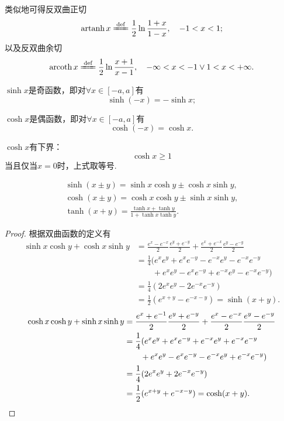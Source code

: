 类似地可得反双曲正切\[
	\artanh x
	\defeq
	\frac{1}{2} \ln\frac{1 + x}{1 - x},
	\quad -1<x<1;
\]
以及反双曲余切\[
	\arcoth x
	\defeq
	\frac{1}{2} \ln\frac{x + 1}{x - 1},
	\quad -\infty<x<-1\lor1<x<+\infty.
\]

\begin{property}
\(\sinh x\)是奇函数，即对\(\forall x \in [-a,a]\)有\[
	\sinh(-x) = -\sinh x;
\]

\(\cosh x\)是偶函数，即对\(\forall x \in [-a,a]\)有\[
	\cosh(-x) = \cosh x.
\]
\end{property}

\begin{property}
\(\cosh x\)有下界：\[
	\cosh x \geq 1
\]
当且仅当\(x=0\)时，上式取等号.
\end{property}

\begin{theorem}
\begin{gather}
	\sinh(x \pm y) = \sinh x\cosh y \pm \cosh x\sinh y, \\
	\cosh(x \pm y) = \cosh x\cosh y \pm \sinh x\sinh y, \\
	\tanh(x + y) = \frac{\tanh x + \tanh y}{1 + \tanh x\tanh y}.
\end{gather}
\begin{proof}
根据双曲函数的定义有
\begin{align*}
	\sinh x\cosh y+\cosh x\sinh y
	&= \frac{e^x - e^{-x}}{2} \frac{e^y + e^{-y}}{2}
		+ \frac{e^x + e^{-x}}{2} \frac{e^y - e^{-y}}{2} \\
	&= \frac{1}{4} (e^x e^y + e^x e^{-y} - e^{-x} e^y - e^{-x} e^{-y} \\
	&\qquad+ e^x e^y - e^x e^{-y} + e^{-x} e^y - e^{-x} e^{-y}) \\
	&= \frac{1}{4} (2 e^x e^y - 2 e^{-x} e^{-y}) \\
	&= \frac{1}{2} (e^{x+y} - e^{-x-y}) = \sinh(x+y).
\end{align*}
\begin{align*}
	\cosh x\cosh y+\sinh x\sinh y
	&= \frac{e^x + e^{-1}}{2} \frac{e^y + e^{-y}}{2}
		+ \frac{e^x - e^{-x}}{2} \frac{e^y - e^{-y}}{2} \\
	&= \frac{1}{4} (e^x e^y + e^x e^{-y} + e^{-x} e^y + e^{-x} e^{-y} \\
	&\qquad+ e^x e^y - e^x e^{-y} - e^{-x} e^y + e^{-x} e^{-y}) \\
	&= \frac{1}{4} (2 e^x e^y + 2 e^{-x} e^{-y}) \\
	&= \frac{1}{2} (e^{x+y} + e^{-x-y}) = \cosh(x+y).
	\qedhere
\end{align*}
\end{proof}
\end{theorem}

